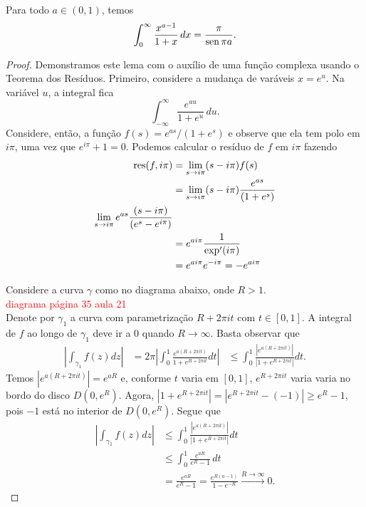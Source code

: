     \begin{lema}
    Para todo $a \in (0,1)$, temos
    $$\int_{0}^{\infty}\frac{x^{a-1}}{1+x} \, dx = \frac{\pi}{\operatorname{sen} \pi a}.$$
    \end{lema}
    \begin{proof}
        Demonstramos este lema com o auxílio de uma função complexa usando o Teorema dos Resíduos. Primeiro, considere a mudança de varáveis $x = e^u$. Na variável $u$, a integral fica
        $$\int_{-\infty}^{\infty}\frac{e^{au}}{1+e^u} \, du. $$
        Considere, então, a função $f(s) = e^{as}/(1+e^s)$ e observe que ela tem polo em $i\pi$, uma vez que $e^{i\pi} + 1 = 0$. Podemos calcular o resíduo de $f$ em $i\pi$ fazendo
        \begin{align*}
            \operatorname{res}(f,i\pi) &= \lim_{s \to i\pi} (s-i\pi) f(s) \\
            &= \lim_{s \to i\pi} (s-i\pi)\frac{e^{as}}{(1+e^s)} \\
            \lim_{s \to i\pi} e^{as}\frac{(s-i\pi)}{(e^s - e^{i\pi})} \\
            &= e^{ai\pi}\frac{1}{\exp'(i\pi)} \\
            &= e^{ai\pi}e^{-i\pi} = -e^{ai\pi}
        \end{align*}
        
        Considere a curva $\gamma$ como no diagrama abaixo, onde $R>1$.
        \\
        \textcolor{red}{diagrama página 35 aula 21}
        \\
        Denote por $\gamma_1$ a curva com parametrização $R + 2\pi i t$ com $t \in [0,1]$. A integral de $f$ ao longo de $\gamma_1$ deve ir a $0$ quando $R \to \infty$. Basta observar que 
        \begin{align*}
            \left | \int_{\gamma_1}f(z) dz   \right | &= 2\pi \left | \int_{0}^{1} \frac{e^{a(R + 2\pi i t)}}{1 + e^{R + 2\pi i t}} dt   \right |
            &\leq \int_{0}^{1} \frac{|e^{a(R + 2\pi i t)}|}{|1 + e^{R + 2\pi i t}|} dt.
        \end{align*}
        Temos $|e^{a(R + 2\pi i t)}| = e^{aR}$ e, conforme $t$ varia em $[0,1]$, $e^{R + 2\pi i t}$ varia varia no bordo do disco $D(0,e^R)$. Agora, $|1 + e^{R + 2\pi i t}| = |e^{R + 2\pi i t} - (-1)| \geq e^R - 1$, pois $-1$ está no interior de $D(0,e^R)$. Segue que
        \begin{align*}
            \left | \int_{\gamma_1}f(z) dz   \right | &\leq \int_{0}^{1} \frac{|e^{a(R + 2\pi i t)}|}{|1 + e^{R + 2\pi i t}|} dt \\
            &\leq \int_{0}^{1}\frac{e^{aR}}{e^R-1} \, dt\\
            &=\frac{e^{aR}}{e^R-1} = \frac{e^{R(a-1)}}{1 - e^{-R}} \xrightarrow{R \to \infty} 0.
        \end{align*}
        

\end{proof}
